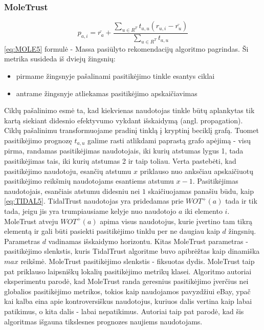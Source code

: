 \documentclass{VUMIFInfMagistrinis}
\begin{document}
\subsubsection{MoleTrust}
\begin{equation}\label{eq:MOLE5}
p_{a,i} = \bar{r_a}+\frac{\sum\limits_{u \in R^T}t_{a,u}(r_{u,i}-\bar{r_u})}{\sum\limits_{u \in R^T} t_{a,u}}
\end{equation}
\eqref{eq:MOLE5} formulė - Massa \cite{11} pasiūlyto rekomendacijų algoritmo pagrindas. Ši metrika susideda iš dviejų žingsnių:
\begin{itemize}
	\item pirmame žingsnyje pašalinami pasitikėjimo tinkle esantys ciklai
	\item antrame žingsnyje atliekamas pasitikėjimo apskaičiavimas
\end{itemize}
Ciklų pašalinimo esmė ta, kad kiekvienas naudotojas tinkle būtų aplankytas tik kartą siekiant didesnio efektyvumo vykdant išskaidymą (angl. propagation).
Ciklų pašalinimu transformuojame pradinį tinklą į kryptinį beciklį grafą. Tuomet pasitikėjimo prognozę $t_{a,u}$ galime rasti atlikdami paprastą grafo apėjimą - visų pirma, randamas pasitikėjimas naudotojais, iki kurių atstumas lygus 1, tada pasitikėjimas tais, iki kurių atstumas 2 ir taip toliau. Verta pastebėti, kad pasitikėjimo naudotoju, esančių atstumu $x$ priklauso nuo anksčiau apskaičiuotų pasitikėjimo reikšmių naudotojams esantiems atstumu $x-1$.
\newline
\indent
Pasitikėjimas naudotojais, esančiais atstumu didesniu nei $1$ skaičiuojamas panašiu būdu, kaip \eqref{eq:TIDAL5}. TidalTrust naudotojas yra pridedamas prie $WOT^+(a)$ tada ir tik tada, jeigu jis yra trumpiausiame kelyje nuo naudotojo $a$ iki elemento $i$. MoleTrust atveju $WOT^+(a)$ apima visus naudotojus, kurie įvertino tam tikrą elementą ir gali būti pasiekti pasitikėjimo tinklu per ne daugiau kaip $d$ žingsnių. Parametras $d$ vadinamas išskaidymo horizontu. Kitas MoleTrust parametras - pasitikėjimo slenkstis, kuris TidalTrust algoritme buvo apibrėžtas kaip dinamiška $max$ reikšmė. MoleTrust pasitikėjimo slenkstis - fiksuotas dydis. 
\newline
\indent
MoleTrust taip pat priklauso laipsniškų lokalių pasitikėjimo metrikų klasei. Algoritmo autoriai eksperimentu parodė, kad MoleTrust randa geresnius pasitikėjimo įverčius nei globalios pasitikėjimo metrikos, tokios kaip naudojamos pavyzdžiui eBay, ypač kai kalba eina apie kontroversiškus naudotojus, kuriuos dalis vertina kaip labai patikimus, o kita dalis - labai nepatikimus. Autoriai taip pat parodė, kad šis algoritmas išgauna tikslesnes prognozes naujiems naudotojams.
\end{document}
